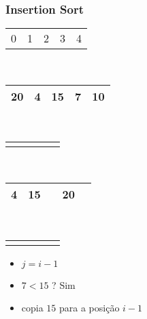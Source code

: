 \documentclass{beamer}
\begin{document}
\begin{frame}
    \frametitle{Insertion Sort}
    \begin{center}
        \begin{table}
            \begin{tabular}{p{0.25cm} p{0.25cm} p{0.25cm} p{0.25cm} p{0.25cm}}
                0 & 1 & 2 & 3 & 4
            \end{tabular} \\
            \begin{tabular}{| p{0.25cm} | p{0.25cm} | p{0.25cm} | p{0.25cm} | p{0.25cm} |}
                \hline
                20 & 4 & 15 & 7 & 10 \\ \hline
            \end{tabular} \\
            \begin{tabular}{p{0.25cm} p{0.25cm} p{0.25cm} p{0.25cm} p{0.25cm}}
                & & & \color{green}{$\uparrow$} &
            \end{tabular} \\
            \begin{tabular}{| p{0.25cm} | p{0.25cm} | p{0.25cm} | p{0.25cm} | p{0.25cm} |}
                \hline
                4 & 15 & & 20 & \\ \hline
            \end{tabular} \\
            \begin{tabular}{p{0.25cm} p{0.25cm} p{0.25cm} p{0.25cm} p{0.25cm}}
                & \color{red}{$\uparrow$} & \color{blue}{$\uparrow$} & &
            \end{tabular}
        \end{table}
	\end{center}
    \color{green}{$ordenando = 7$}
    \begin{itemize}[<+->]
        \item $j = i - 1$
        \item $7 < 15$ ? Sim
        \item copia $15$ para a posição $i - 1$
    \end{itemize}
\end{frame}
\end{document}
